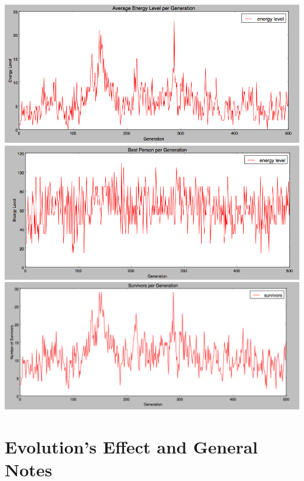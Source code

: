 \documentclass{article}
\begin{document}
\includegraphics[width=1.25\textwidth]{40des_avg_energy}
\includegraphics[width=1\textwidth]{40des_best}
\includegraphics[width=1\textwidth]{40des_survivors}



\section{Evolution's Effect and General Notes}
\end{document}
